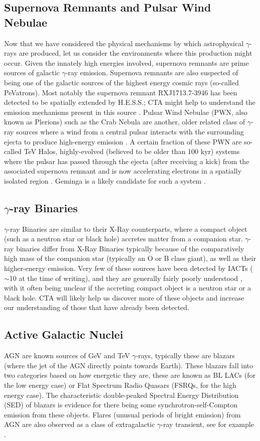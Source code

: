 \subsection{Supernova Remnants and Pulsar Wind Nebulae}
Now that we have considered the physical mechanisms by which astrophysical $\gamma$-rays are produced, let us consider the environments where this production might occur. Given the innately high energies involved, supernova remnants are prime sources of galactic $\gamma$-ray emission. Supernova remnants are also suspected of being one of the galactic sources of the highest energy cosmic rays (so-called PeVatrons). Most notably the supernova remnant RXJ1713.7-3946 has been detected to be spatially extended by H.E.S.S.; CTA might help to understand the emission mechanisms present in this source \cite{rxjcta}. Pulsar Wind Nebulae (PWN, also known as Plerions) such as the Crab Nebula are another, older related class of $\gamma$-ray sources where a wind from a central pulsar interacts with the surrounding ejecta to produce high-energy emission \cite{magiccrab}. A certain fraction of these PWN are so-called TeV Halos, highly-evolved (believed to be older than 100 kyr) systems where the pulsar has passed through the ejecta (after receiving a kick) from the associated supernova remnant and is now accelerating electrons in a spatially isolated region \cite{tevhalo}. Geminga is a likely candidate for such a system \cite{geminga}.

\subsection{$\gamma$-ray Binaries}
$\gamma$-ray Binaries are similar to their X-Ray counterparts, where a compact object (such as a neutron star or black hole) accretes matter from a companion star. $\gamma$-ray binaries differ from X-Ray Binaries typically because of the comparatively high mass of the companion star (typically an O or B class giant), as well as their higher-energy emission. Very few of these sources have been detected by IACTs ($\sim$10 at the time of writing), and they are generally fairly poorly understood \cite{scienceCTA}, with it often being unclear if the accreting compact object is a neutron star or a black hole. CTA will likely help us discover more of these objects and increase our understanding of those that have already been detected.

\subsection{Active Galactic Nuclei}
AGN are known sources of GeV and TeV $\gamma$-rays, typically these are blazars (where the jet of the AGN directly points towards Earth). These blazars fall into two categories based on how energetic they are, these are known as BL LACs (for the low energy case) or Flat Spectrum Radio Quasars (FSRQs, for the high energy case). The characteristic double-peaked Spectral Energy Distribution (SED) of blazars is evidence for there being some synchrotron-self-Compton emission from these objects. Flares (unusual periods of bright emission) from AGN are also observed as a class of extragalactic $\gamma$-ray transient, see for example \cite{TXS}.

